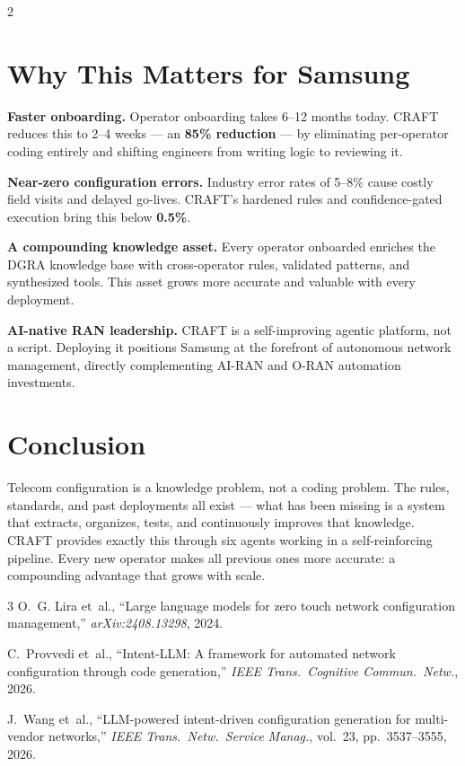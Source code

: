 \documentclass[10.5pt]{article}
\begin{document}
\begin{multicols}{2}
\section{Why This Matters for Samsung}

\textbf{Faster onboarding.} Operator onboarding takes 6--12 months today. CRAFT reduces this to
2--4 weeks --- an \textbf{85\% reduction} --- by eliminating per-operator coding entirely and
shifting engineers from writing logic to reviewing it.

\textbf{Near-zero configuration errors.} Industry error rates of 5--8\% cause costly field visits
and delayed go-lives. CRAFT's hardened rules and confidence-gated execution bring this below
\textbf{0.5\%}.

\textbf{A compounding knowledge asset.} Every operator onboarded enriches the DGRA knowledge base
with cross-operator rules, validated patterns, and synthesized tools. This asset grows more
accurate and valuable with every deployment.

\textbf{AI-native RAN leadership.} CRAFT is a self-improving agentic platform, not a script.
Deploying it positions Samsung at the forefront of autonomous network management, directly
complementing AI-RAN and O-RAN automation investments.

\section{Conclusion}

Telecom configuration is a knowledge problem, not a coding problem. The rules, standards, and
past deployments all exist --- what has been missing is a system that extracts, organizes, tests,
and continuously improves that knowledge. CRAFT provides exactly this through six agents working
in a self-reinforcing pipeline. Every new operator makes all previous ones more accurate: a
compounding advantage that grows with scale.

\vspace{4pt}
\begin{thebibliography}{3}
\small
{}
O.~G. Lira et~al., ``Large language models for zero touch network configuration management,''
\emph{arXiv:2408.13298}, 2024.

C.~Provvedi et~al., ``Intent-LLM: A framework for automated network configuration through code
generation,'' \emph{IEEE Trans.\ Cognitive Commun.\ Netw.}, 2026.

J.~Wang et~al., ``LLM-powered intent-driven configuration generation for multi-vendor networks,''
\emph{IEEE Trans.\ Netw.\ Service Manag.}, vol.~23, pp.~3537--3555, 2026.
\end{thebibliography}

\end{multicols}
\end{document}
